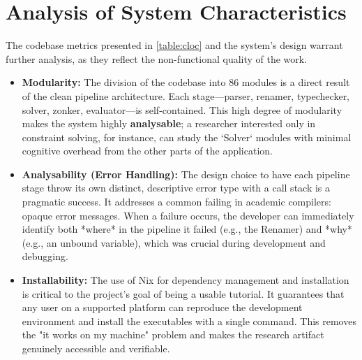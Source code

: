 \section{Analysis of System Characteristics}
\label{sec:Discussion:Characteristics}
The codebase metrics presented in \cref{table:cloc} and the system's design warrant further analysis, as they reflect the non-functional quality of the work.

\begin{itemize}
    \item \textbf{Modularity:} The division of the codebase into 86 modules is a direct result of the clean pipeline architecture. Each stage—parser, renamer, typechecker, solver, zonker, evaluator—is self-contained. This high degree of modularity makes the system highly \textbf{analysable}; a researcher interested only in constraint solving, for instance, can study the `Solver` modules with minimal cognitive overhead from the other parts of the application.

    \item \textbf{Analysability (Error Handling):} The design choice to have each pipeline stage throw its own distinct, descriptive error type with a call stack is a pragmatic success. It addresses a common failing in academic compilers: opaque error messages. When a failure occurs, the developer can immediately identify both *where* in the pipeline it failed (e.g., the Renamer) and *why* (e.g., an unbound variable), which was crucial during development and debugging.

    \item \textbf{Installability:} The use of Nix for dependency management and installation is critical to the project's goal of being a usable tutorial. It guarantees that any user on a supported platform can reproduce the development environment and install the executables with a single command. This removes the "it works on my machine" problem and makes the research artifact genuinely accessible and verifiable.
\end{itemize}

